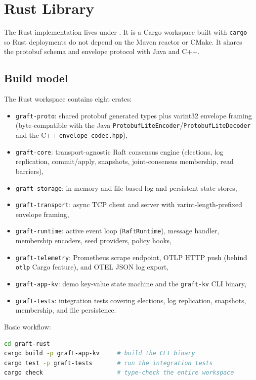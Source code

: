 \section{Rust Library}
\label{sec:RustLibrary}

The Rust implementation lives under . It is a Cargo
workspace built with \texttt{cargo} so Rust deployments do not depend on the
Maven reactor or CMake. It shares the protobuf schema and envelope protocol with
Java and C++.

\subsection{Build model}

The Rust workspace contains eight crates:

\begin{itemize}
\item \texttt{graft-proto}: shared protobuf generated types plus varint32
envelope framing (byte-compatible with the Java
\texttt{ProtobufLiteEncoder}/\texttt{ProtobufLiteDecoder} and the C++
\texttt{envelope\_codec.hpp}),
\item \texttt{graft-core}: transport-agnostic Raft consensus engine (elections,
log replication, commit/apply, snapshots, joint-consensus membership, read
barriers),
\item \texttt{graft-storage}: in-memory and file-based log and persistent state
stores,
\item \texttt{graft-transport}: async TCP client and server with varint-length-prefixed
envelope framing,
\item \texttt{graft-runtime}: active event loop (\texttt{RaftRuntime}), message
handler, membership encoders, seed providers, policy hooks,
\item \texttt{graft-telemetry}: Prometheus scrape endpoint, OTLP HTTP push
(behind \texttt{otlp} Cargo feature), and OTEL JSON log export,
\item \texttt{graft-app-kv}: demo key-value state machine and the
\texttt{graft-kv} CLI binary,
\item \texttt{graft-tests}: integration tests covering elections, log
replication, snapshots, membership, and file persistence.
\end{itemize}

Basic workflow:

\begin{lstlisting}[language=bash,caption={Rust build workflow}]
cd graft-rust
cargo build -p graft-app-kv     # build the CLI binary
cargo test -p graft-tests       # run the integration tests
cargo check                     # type-check the entire workspace
\end{lstlisting}

